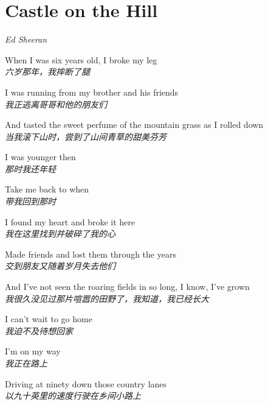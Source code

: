 \section{Castle on the Hill}

\thispagestyle{empty}


\begin{center}
\textit{Ed Sheeran}
\end{center}

\vspace{1em}

\begin{spacing}{1.5}
\begin{flushleft}
When I was six years old, I broke my leg\\
\textit{六岁那年，我摔断了腿}\lyricspace

I was running from my brother and his friends\\
\textit{我正逃离哥哥和他的朋友们}\lyricspace

And tasted the sweet perfume of the mountain grass as I rolled down\\
\textit{当我滚下山时，尝到了山间青草的甜美芬芳}\lyricspace

I was younger then\\
\textit{那时我还年轻}\lyricspace

Take me back to when\\
\textit{带我回到那时}\lyricspace

I found my heart and broke it here\\
\textit{我在这里找到并破碎了我的心}\lyricspace

Made friends and lost them through the years\\
\textit{交到朋友又随着岁月失去他们}\lyricspace

And I've not seen the roaring fields in so long, I know, I've grown\\
\textit{我很久没见过那片喧嚣的田野了，我知道，我已经长大}\lyricspace

I can't wait to go home\\
\textit{我迫不及待想回家}\lyricspace

I'm on my way\\
\textit{我正在路上}\lyricspace

Driving at ninety down those country lanes\\
\textit{以九十英里的速度行驶在乡间小路上}\lyricspace


\end{flushleft}
\end{spacing}
